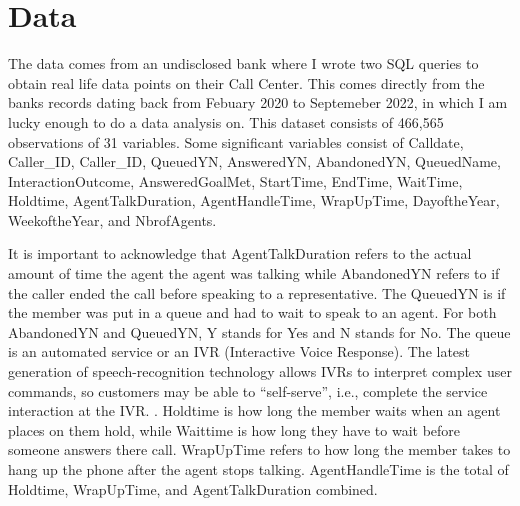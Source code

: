 \documentclass[12pt]{article}
\begin{document}
\section*{Data}
\begin{sloppypar}
  The data comes from an undisclosed bank where I wrote two SQL queries to obtain real life data points on their Call Center. This comes directly from the banks records dating back from Febuary 2020
  to Septemeber 2022, in which I am lucky enough to do a data analysis on. This dataset consists of 466,565 observations of 31 variables. 
  Some significant variables consist of Calldate, Caller_ID, Caller_ID, QueuedYN, AnsweredYN, AbandonedYN, QueuedName, InteractionOutcome, 
  AnsweredGoalMet, StartTime, EndTime, WaitTime, Holdtime, AgentTalkDuration, AgentHandleTime, WrapUpTime, DayoftheYear,
  WeekoftheYear, and NbrofAgents.
\end{sloppypar}
  It is important to acknowledge that AgentTalkDuration refers to the actual amount of time the agent the agent was talking while
AbandonedYN refers to if the caller ended the call before speaking to a representative. The QueuedYN is if the member was put in a queue and had to wait to speak to an agent. 
For both AbandonedYN and QueuedYN, Y stands for Yes and N stands for No.
The queue is an automated service or an IVR (Interactive Voice Response). The latest generation of speech-recognition technology allows
IVRs to interpret complex user commands, so customers may be able to “self-serve”, i.e., complete the service interaction at the IVR. \citep{avramidis2005modeling}.
Holdtime is how long the member waits when an agent places on them hold, while Waittime is how long they have to wait before someone answers there call.
WrapUpTime refers to how long the member takes to hang up the phone after the agent stops talking. AgentHandleTime is the total of Holdtime, WrapUpTime, and AgentTalkDuration combined.
\end{document}
